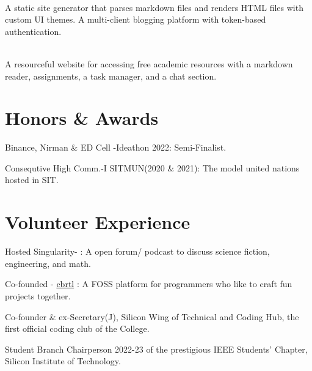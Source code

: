 \documentclass[]{assets/deedy-resume-openfont}
\begin{document}
\hfill {}\\
A static site generator that parses markdown files and renders HTML files with custom UI themes. A multi-client blogging platform with token-based authentication. \\
\sectionsep


\hfill {}\\
A resourceful website for accessing free academic resources with a markdown reader, assignments, a task manager, and a chat section.\\

\sectionsep
%
%
\section{Honors \& Awards}
\begin{tightemize}  
\item Binance, Nirman \& ED Cell -Ideathon 2022: Semi-Finalist.\\
\item Consequtive High Comm.-I SITMUN(2020 \& 2021): The model united nations hosted in SIT.
\end{tightemize}
\section{Volunteer Experience}
\begin{tightemize}  
\item Hosted Singularity- : A open forum/ podcast to discuss science fiction, engineering, and math.\\
\item Co-founded - \href{https://cbrtl.github.io}{cbrtl} : A FOSS platform for programmers who like to craft fun projects together.\\
\item Co-founder \& ex-Secretary(J), Silicon Wing of Technical and Coding Hub, the first official coding club of the College.\\
\item Student Branch Chairperson 2022-23 of the prestigious IEEE Students’ Chapter, Silicon Institute of Technology.\\
\end{tightemize}
\ 
\end{document}
